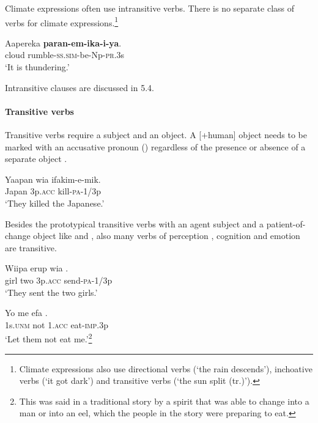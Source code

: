 Climate expressions often use intransitive verbs. There is no separate class of verbs for climate expressions.\footnote{Climate expressions also use directional verbs (`the rain descends'), inchoative verbs (`it got dark') and transitive verbs (`the sun split (tr.)').}

\ea%
\label{ex:3:x270}
\gll Aapereka \textbf{paran-em-ika-i-ya}. \\
cloud rumble-\textsc{ss}.\textsc{sim}-be-Np-\textsc{pr}.3s\\
\glt`It is thundering.'
\z

Intransitive clauses are discussed in 5.4.

\paragraph{Transitive verbs}\label{sec:3:a:z:y:x}
{}
Transitive verbs require a subject and an object. A [+human] object needs to be marked with an accusative pronoun () regardless of the presence or absence of a separate object . 

\ea%
\label{ex:3:x294}
\gll Yaapan wia ifakim-e-mik. \\
Japan 3p.\textsc{acc} kill-\textsc{pa}-1/3p \\
\glt`They killed the Japanese.'
\z

Besides the prototypical transitive verbs with an agent subject and a patient-of-change object \citep[96]{Givon1984} like  and , also many verbs of perception , cognition  and emotion  are transitive.

\ea%
\label{ex:3:x295}
\gll Wiipa erup wia . \\
girl two 3p.\textsc{acc} send-\textsc{pa}-1/3p \\
\glt`They sent the two girls.'
\z

\ea%
\label{ex:3:x296}
\gll Yo me efa . \\
1s.\textsc{unm} not 1.\textsc{acc} eat-\textsc{imp}.3p \\
\glt`Let them not eat me.'\footnote{This was said in a traditional story by a spirit that was able to change into a man or into an eel, which the people in the story were preparing to eat.}
\z

